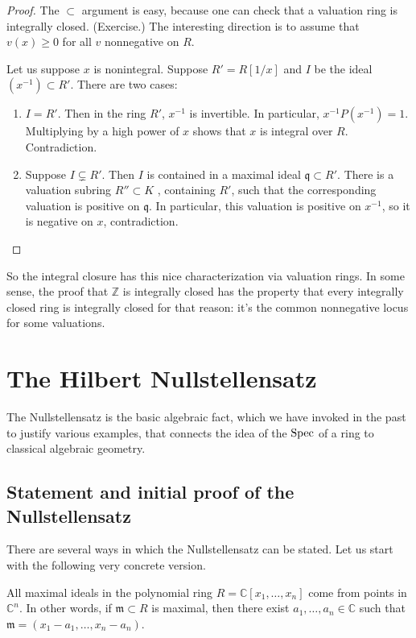 \begin{proof}
The $\subset$ argument is easy, because one can check that a valuation ring is
integrally closed. (Exercise.)
The interesting direction is to assume that $v(x) \geq 0$ for all $v$
nonnegative
on $R$.

Let us suppose $x$ is nonintegral. Suppose $R' = R[1/x]$ and $I$ be the ideal
$(x^{-1}) \subset R'$. There are two cases:
\begin{enumerate}
\item $I = R'$. Then in the ring $R'$, $x^{-1} $ is invertible. In particular,
$x^{-1}P(x^{-1}) = 1$. Multiplying by a high power of $x$ shows that $x$ is
integral over $R$.  Contradiction.
\item  Suppose $I \subsetneq R'$. Then $I$ is contained in a maximal ideal
$\mathfrak{q} \subset R'$.  There is a valuation subring $R'' \subset K$ ,
containing $R'$, such that the corresponding valuation is positive on
$\mathfrak{q}$.  In particular, this valuation is positive on $x^{-1}$,
so it is
negative on $x$, contradiction.
\end{enumerate}
\end{proof}

So the integral closure has this nice characterization via valuation rings. In
some sense, the proof that $\mathbb{Z}$ is integrally closed has the property
that every integrally closed ring is integrally closed for that reason:
it's the
common nonnegative locus for some valuations.

\section{The Hilbert Nullstellensatz}

The Nullstellensatz is the basic algebraic fact, which we have invoked in the
past to justify various examples, that connects the idea of
the $\operatorname{Spec}$ of a ring to classical algebraic geometry.

\subsection{Statement and initial proof of the Nullstellensatz}

There are several ways in which the Nullstellensatz can be stated. Let us
start with the following very concrete version.

\begin{theorem} \label{nullstellensatzoverC}
All maximal ideals in the polynomial ring $R=\mathbb{C}[x_1, \dots, x_n]$ come
from points in $\mathbb{C}^n$. In other words, if $\mathfrak{m} \subset R$ is
maximal, then there exist $a_1, \dots, a_n \in \mathbb{C}$ such that
$\mathfrak{m} = (x_1 - a_1, \dots, x_n - a_n)$.
\end{theorem}


